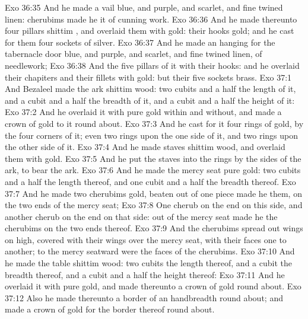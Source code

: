 \vs Exo 36:35 And he made a vail  blue, and purple, and scarlet, and fine twined linen:  cherubims made he it of cunning work.
\vs Exo 36:36 And he made thereunto four pillars  shittim , and overlaid them with gold: their hooks  gold; and he cast for them four sockets of silver.
\vs Exo 36:37 And he made an hanging for the tabernacle door  blue, and purple, and scarlet, and fine twined linen, of needlework;
\vs Exo 36:38 And the five pillars of it with their hooks: and he overlaid their chapiters and their fillets with gold: but their five sockets  brass.
\vs Exo 37:1 And Bezaleel made the ark  shittim wood: two cubits and a half  the length of it, and a cubit and a half the breadth of it, and a cubit and a half the height of it:
\vs Exo 37:2 And he overlaid it with pure gold within and without, and made a crown of gold to it round about.
\vs Exo 37:3 And he cast for it four rings of gold,  by the four corners of it; even two rings upon the one side of it, and two rings upon the other side of it.
\vs Exo 37:4 And he made staves  shittim wood, and overlaid them with gold.
\vs Exo 37:5 And he put the staves into the rings by the sides of the ark, to bear the ark.
\vs Exo 37:6 And he made the mercy seat  pure gold: two cubits and a half  the length thereof, and one cubit and a half the breadth thereof.
\vs Exo 37:7 And he made two cherubims  gold, beaten out of one piece made he them, on the two ends of the mercy seat;
\vs Exo 37:8 One cherub on the end on this side, and another cherub on the  end on that side: out of the mercy seat made he the cherubims on the two ends thereof.
\vs Exo 37:9 And the cherubims spread out  wings on high,  covered with their wings over the mercy seat, with their faces one to another;  to the mercy seatward were the faces of the cherubims.
\vs Exo 37:10 And he made the table  shittim wood: two cubits  the length thereof, and a cubit the breadth thereof, and a cubit and a half the height thereof:
\vs Exo 37:11 And he overlaid it with pure gold, and made thereunto a crown of gold round about.
\vs Exo 37:12 Also he made thereunto a border of an handbreadth round about; and made a crown of gold for the border thereof round about.
